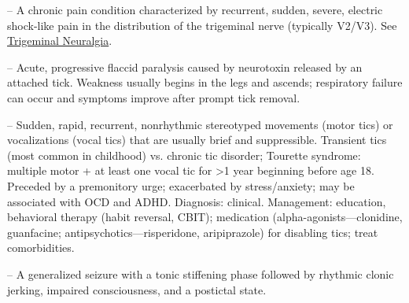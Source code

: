 -- A chronic pain condition characterized by recurrent, sudden, severe, electric shock-like pain in the distribution of the trigeminal nerve (typically V2/V3). See \hyperlink{Trigeminal Neuralgia}{Trigeminal Neuralgia}.

-- Acute, progressive flaccid paralysis caused by neurotoxin released by an attached tick. Weakness usually begins in the legs and ascends; respiratory failure can occur and symptoms improve after prompt tick removal.

-- Sudden, rapid, recurrent, nonrhythmic stereotyped movements (motor tics) or vocalizations (vocal tics) that are usually brief and suppressible. Transient tics (most common in childhood) vs. chronic tic disorder; Tourette syndrome: multiple motor + at least one vocal tic for >1 year beginning before age 18. Preceded by a premonitory urge; exacerbated by stress/anxiety; may be associated with OCD and ADHD. Diagnosis: clinical. Management: education, behavioral therapy (habit reversal, CBIT); medication (alpha-agonists—clonidine, guanfacine; antipsychotics—risperidone, aripiprazole) for disabling tics; treat comorbidities.

-- A generalized seizure with a tonic stiffening phase followed by rhythmic clonic jerking, impaired consciousness, and a postictal state.

